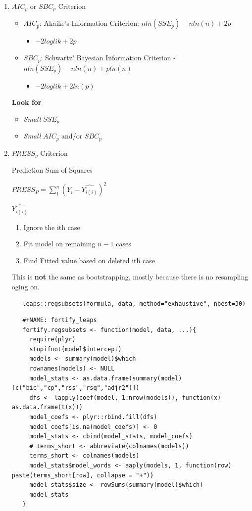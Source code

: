\documentclass[11pt]{article}
\begin{document}
\begin{enumerate}
\item \(AIC_p\) or \(SBC_p\) Criterion
\begin{itemize}
\item \(AIC_p\): Akaike's Information Criterion:  \(n ln(SSE_p) - n ln(n) + 2p\)
\begin{itemize}
\item \(-2 loglik + 2p\)
\end{itemize}
\item \(SBC_p\): Schwartz' Bayesian Information Criterion - \(n ln(SSE_p) - n
     ln(n) + p ln(n)\)
\begin{itemize}
\item \(-2 loglik + 2 ln(p)\)
\end{itemize}
\end{itemize}

\textbf{Look for}
\begin{itemize}
\item \emph{Small} \(SSE_p\)
\item \emph{Small} \(AIC_p\) and/or \(SBC_p\)
\end{itemize}

\item \(PRESS_p\) Criterion

Prediction Sum of Squares

\(PRESS_P = \sum_{1}^{n} (Y_i - \hat{Y_{i (i)}})^2\)

\textbf{\(\hat{Y_{i(i)}}\)}
\begin{enumerate}
\item Ignore the ith case
\item Fit model on remaining \(n - 1\) cases
\item Find Fitted value based on deleted ith case
\end{enumerate}

This is \textbf{not} the same as bootstrapping, mostly because there is no
resampling oging on.

\begin{verbatim}
   leaps::regsubsets(formula, data, method="exhaustive", nbest=30)
\end{verbatim}

\begin{verbatim}
   #+NAME: fortify_leaps
   fortify.regsubsets <- function(model, data, ...){
     require(plyr)
     stopifnot(model$intercept)
     models <- summary(model)$which
     rownames(models) <- NULL
     model_stats <- as.data.frame(summary(model)[c("bic","cp","rss","rsq","adjr2")])
     dfs <- lapply(coef(model, 1:nrow(models)), function(x) as.data.frame(t(x)))
     model_coefs <- plyr::rbind.fill(dfs)
     model_coefs[is.na(model_coefs)] <- 0
     model_stats <- cbind(model_stats, model_coefs)
     # terms_short <- abbreviate(colnames(models))
     terms_short <- colnames(models)
     model_stats$model_words <- aaply(models, 1, function(row) paste(terms_short[row], collapse = "+"))
     model_stats$size <- rowSums(summary(model)$which)
     model_stats
   }


\end{verbatim}
\end{enumerate}
\end{document}
